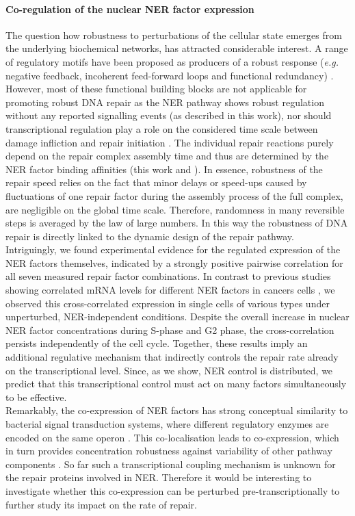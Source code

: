 \paragraph{Co-regulation of the nuclear NER factor expression}    The question how robustness to perturbations of the cellular state emerges from the underlying biochemical networks, has attracted considerable interest. A range of regulatory motifs have been proposed as producers of a robust response (\textit{e.g.} negative feedback, incoherent feed-forward loops and functional redundancy) \cite{Alon2007,Bleris2011,Yi2000,Manuscript2011}. However, most of these functional building blocks are not applicable for promoting robust DNA repair as the NER pathway shows robust regulation without any reported signalling events (as described in this work), nor should transcriptional regulation play a role on the considered time scale between damage infliction and repair initiation \cite{Mone2001}. The individual repair reactions purely depend on the repair complex assembly time and thus are determined by the NER factor binding affinities (this work and \cite{Luijsterburg2010}). In essence, robustness of the repair speed relies on the fact that minor delays or speed-ups caused by fluctuations of one repair factor during the assembly process of the full complex, are negligible on the global time scale. Therefore, randomness in many reversible steps is averaged by the law of large numbers. In this way the robustness of DNA repair is directly linked to the dynamic design of the repair pathway.\\     
Intriguingly, we found experimental evidence for the regulated expression of the NER factors themselves, indicated by a strongly positive pairwise correlation for all seven measured repair factor combinations. In contrast to previous studies showing correlated mRNA \label{sec:mRNA} levels for different NER factors in cancers cells \cite{Damia1998,Cheng2000}, we observed this cross-correlated expression in single cells of various types under unperturbed, NER-independent conditions. Despite the overall increase in nuclear NER factor concentrations during S-phase and G2 phase, the cross-correlation persists independently of the cell cycle. Together, these results imply an additional regulative mechanism that indirectly controls the repair rate already on the transcriptional level. Since, as we show, NER control is distributed, we predict that this transcriptional control must act on many factors simultaneously to be effective.\\
Remarkably, the co-expression of NER factors has strong conceptual similarity to bacterial signal transduction systems, where different regulatory enzymes are encoded on the same operon \cite{Kollmann2005,Lovdok2009}. This co-localisation leads to co-expression, which in turn provides concentration robustness against variability of other pathway components \cite{Bluthgen2013}. So far such a transcriptional coupling mechanism is unknown for the repair proteins involved in NER. Therefore it would be interesting to investigate whether this co-expression can be perturbed pre-transcriptionally to further study its impact on the rate of repair. 

